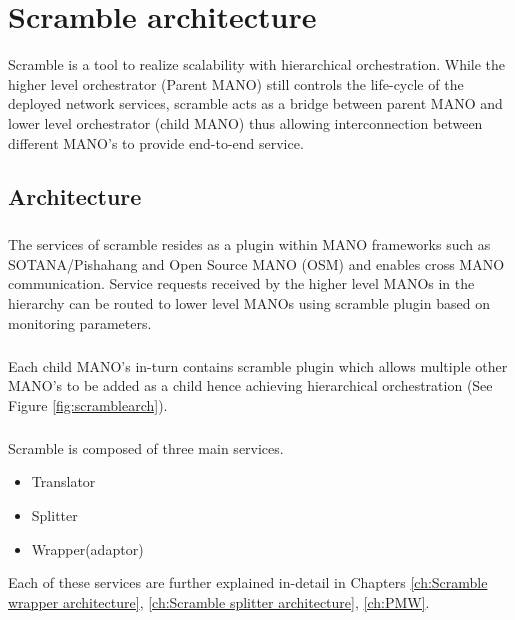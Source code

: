 \chapter{Scramble architecture}
\label{ch:Scramble architecture}

Scramble is a tool to realize scalability with hierarchical orchestration. While the higher level orchestrator (Parent MANO) still controls the life-cycle of the deployed network services, scramble acts as a bridge between parent MANO and lower level orchestrator (child MANO) thus allowing interconnection between different MANO's to provide end-to-end service.  
 
\section{Architecture}
\paragraph{}
The services of scramble resides as a plugin within MANO frameworks such as SOTANA/Pishahang and Open Source MANO (OSM) and enables cross MANO communication. Service requests received by the higher level MANOs in the hierarchy can be routed to lower level MANOs using scramble plugin based on monitoring parameters.


\paragraph{}
Each child MANO's in-turn contains scramble plugin which allows multiple other MANO's to be added as a child hence achieving hierarchical orchestration (See Figure \ref{fig:scramblearch}).

\paragraph{}

Scramble is composed of three main services.
\begin{itemize}
	\item Translator
	\item Splitter
	\item Wrapper(adaptor)
	\end{itemize} 
Each of these services are further explained in-detail in Chapters \ref{ch:Scramble wrapper architecture}, \ref{ch:Scramble splitter architecture}, \ref{ch:PMW}.

